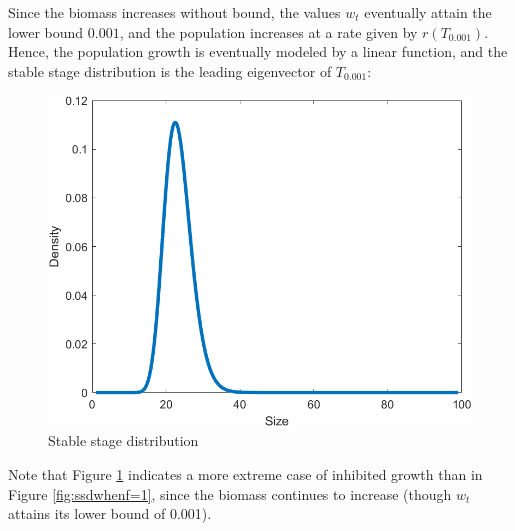 Since the biomass increases without bound, the values $w_t$ eventually attain the lower bound $0.001$, and the population increases at a rate given by $r(T_{0.001})$. Hence, the population growth is eventually modeled by a linear function, and the stable stage distribution is the leading eigenvector of $T_{0.001}$:

\begin{figure}[H]
	\centering
	\includegraphics[width=0.7\linewidth]{Images/F=1000/ssd_when_f=1000}
	\caption{Stable stage distribution}
	\label{fig:ssdwhenf=1000}
\end{figure}

Note that Figure \ref{fig:ssdwhenf=1000} indicates a more extreme case of inhibited growth than in Figure \ref{fig:ssdwhenf=1}, since the biomass continues to increase (though $w_t$ attains its lower bound of 0.001).













